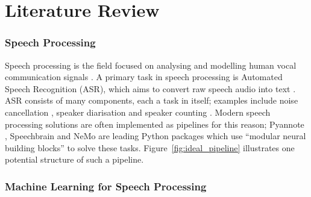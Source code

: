 \chapter{Literature Review}

\subsection{Speech Processing}
Speech processing is the field focused on analysing and modelling human vocal communication signals \cite{sciencedirect}. A primary task in speech processing is Automated Speech Recognition (ASR), which aims to convert raw speech audio into text \cite{speechprocessing_review}. ASR consists of many components, each a task in itself; examples include noise cancellation \cite{noisecancellation}, speaker diarisation \cite{diarization} and speaker counting \cite{speaker_counting}. Modern speech processing solutions are often implemented as pipelines for this reason; Pyannote \cite{pyannote2020, pyannote2021}, Speechbrain \cite{speechbrain} and NeMo \cite{nemo} are leading Python packages which use ``modular neural building blocks'' to solve these tasks. Figure~\ref{fig:ideal_pipeline} illustrates one potential structure of such a pipeline.

\subsection{Machine Learning for Speech Processing}

